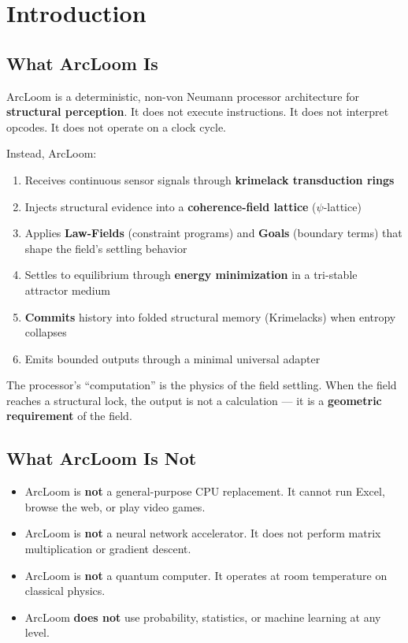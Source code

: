 \documentclass[11pt, a4paper]{report}
\begin{document}
\chapter{Introduction}

\section{What ArcLoom Is}

ArcLoom is a deterministic, non-von Neumann processor architecture for
\textbf{structural perception}. It does not execute instructions. It does
not interpret opcodes. It does not operate on a clock cycle.

Instead, ArcLoom:
\begin{enumerate}[nosep]
  \item Receives continuous sensor signals through \textbf{krimelack
        transduction rings}
  \item Injects structural evidence into a \textbf{coherence-field lattice}
        ($\psi$-lattice)
  \item Applies \textbf{Law-Fields} (constraint programs) and
        \textbf{Goals} (boundary terms) that shape the field's settling
        behavior
  \item Settles to equilibrium through \textbf{energy minimization} in a
        tri-stable attractor medium
  \item \textbf{Commits} history into folded structural memory
        (Krimelacks) when entropy collapses
  \item Emits bounded outputs through a minimal universal adapter
\end{enumerate}

The processor's ``computation'' is the physics of the field settling.
When the field reaches a structural lock, the output is not a calculation
--- it is a \textbf{geometric requirement} of the field.

\section{What ArcLoom Is Not}

\begin{itemize}[nosep]
  \item ArcLoom is \textbf{not} a general-purpose CPU replacement. It
        cannot run Excel, browse the web, or play video games.
  \item ArcLoom is \textbf{not} a neural network accelerator. It does not
        perform matrix multiplication or gradient descent.
  \item ArcLoom is \textbf{not} a quantum computer. It operates at room
        temperature on classical physics.
  \item ArcLoom \textbf{does not} use probability, statistics, or machine
        learning at any level.
\end{itemize}
\end{document}
